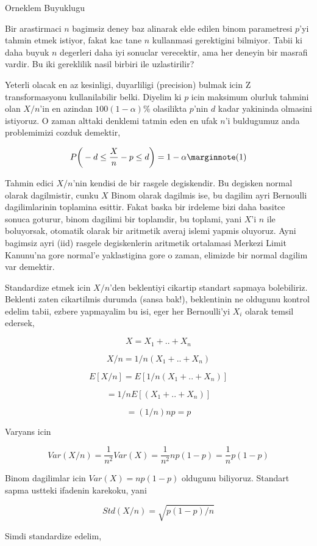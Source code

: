 \documentclass[12pt,fleqn]{article}\usepackage{../common}
\begin{document}
Orneklem Buyuklugu

Bir arastirmaci $n$ bagimsiz deney baz alinarak elde edilen binom
parametresi $p$'yi tahmin etmek istiyor, fakat kac tane $n$ kullanmasi
gerektigini bilmiyor. Tabii ki daha buyuk $n$ degerleri daha iyi sonuclar
verecektir, ama her deneyin bir masrafi vardir. Bu iki gereklilik nasil
birbiri ile uzlastirilir?

Yeterli olacak en az kesinligi, duyarliligi (precision) bulmak icin Z
transformasyonu kullanilabilir belki. Diyelim ki $p$ icin maksimum olurluk
tahmini olan $X/n$'in en azindan $100(1-\alpha)\%$ olasilikta $p$'nin $d$
kadar yakininda olmasini istiyoruz. O zaman alttaki denklemi tatmin eden en
ufak $n$'i buldugumuz anda problemimizi cozduk demektir, 

$$ P\bigg( -d \le \frac{X}{n} - p \le d \bigg)  = 1-\alpha
\mlabel{1}
$$

Tahmin edici $X/n$'nin kendisi de bir rasgele degiskendir. Bu degisken
normal olarak dagilmistir, cunku $X$ Binom olarak dagilmis ise, bu dagilim
ayri Bernoulli dagilimlarinin toplamina esittir. Fakat baska bir irdeleme
bizi daha basitce sonuca goturur, binom dagilimi bir toplamdir, bu toplami,
yani $X$'i $n$ ile boluyorsak, otomatik olarak bir aritmetik averaj islemi
yapmis oluyoruz. Ayni bagimsiz ayri (iid) rasgele degiskenlerin aritmetik
ortalamasi Merkezi Limit Kanunu'na gore normal'e yaklastigina gore o zaman,
elimizde bir normal dagilim var demektir. 

Standardize etmek icin $X/n$'den beklentiyi cikartip standart sapmaya
bolebiliriz. Beklenti zaten cikartilmis durumda (sansa bak!),
beklentinin ne oldugunu kontrol edelim tabii, ezbere yapmayalim bu isi,
eger her Bernoulli'yi $X_i$ olarak temsil edersek,

$$ X = X_1 + .. + X_n $$

$$ X/n = 1/n(X_1 + .. + X_n )$$

$$ E[X/n] = E[1/n(X_1 + .. + X_n )]$$

$$  = 1/nE[(X_1 + .. + X_n )]$$

$$  = (1/n)np = p$$

Varyans icin

$$ Var(X/n) = \frac{1}{n^2}Var(X) = \frac{1}{n^2}np(1-p)=
\frac{1}{n}p(1-p) 
$$

Binom dagilimlar icin $Var(X) = np(1-p)$ oldugunu biliyoruz. Standart sapma
ustteki ifadenin karekoku, yani

$$ Std(X/n) = \sqrt{p(1-p)/n}
$$

Simdi standardize edelim,
\end{document}
